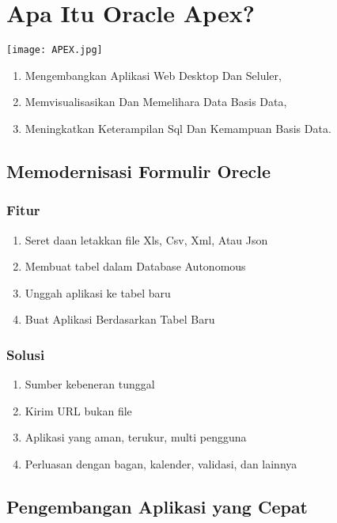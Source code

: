 \documentclass{article}
\begin{document}
\section{Apa Itu Oracle Apex?}
\usepackage{Kerangka Kerja Pengembangan Aplikasi Web Database-centric.}
\begin{center}
    \texttt{[image: APEX.jpg]}
\end{center}
\begin{enumerate}
    \item Mengembangkan Aplikasi Web Desktop Dan Seluler, 
    \item Memvisualisasikan Dan Memelihara Data Basis Data, 
    \item Meningkatkan Keterampilan Sql Dan Kemampuan Basis Data.
\end{enumerate}

\subsection{Memodernisasi Formulir Orecle}
\subsubsection{Fitur}
\begin{enumerate}
    \item Seret daan letakkan file Xls, Csv, Xml, Atau Json
    \item Membuat tabel dalam Database Autonomous
    \item Unggah aplikasi ke tabel baru
    \item Buat Aplikasi Berdasarkan Tabel Baru
	\end{enumerate}
\subsubsection{Solusi}
\begin{enumerate}
    \item Sumber kebeneran tunggal
    \item Kirim URL bukan file
    \item Aplikasi yang aman, terukur, multi pengguna
    \item Perluasan dengan bagan, kalender, validasi, dan lainnya
    \end{enumerate}

\subsection{Pengembangan Aplikasi yang Cepat}
\end{document}
